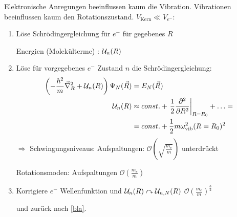	Elektronische Anregungen beeinflussen kaum die Vibration. Vibrationen beeinflussen kaum den Rotationszustand. 
	$V_{\mathrm{Kern}} \ll V_{e^-}$:
	\begin{enumerate}[1.]
		\item Löse Schrödingergleichung für $e^-$ für gegebenes $R$
		
			Energien (Molekülterme) : $\mathcal{U}_n(R)$
		\item Löse für vorgegebenes $e^-$ Zustand $n$ die Schrödingergleichung: \label{bla}
				\begin{align*}
					\left( - \frac{\hbar^2}{m} \vec{\nabla}_R^2 + \mathcal{U}_n (R)
					\right)	
					\Psi_N (\vec{R}) &= E_N (\vec{R}) \\
					\mathcal{U}_n (R) &\approx const. + \left.\frac{1}{2} \frac{\partial^2}{\partial R^2}
					\right|_{R=R_0} + \ldots = \\
					&= const. + \frac{1}{2} m \omega_{\mathrm{vib}}^2 (R=R_0)^2 
				\end{align*}
			$\Rightarrow$ Schwingungsniveaus: Aufspaltungen: $\mathscr{O} \left(\sqrt{\frac{m_e}{m}}\right)$ unterdrückt
			
			Rotationsmoden: Aufspaltungen $\mathscr{O} \left(\frac{m_e}{m}\right)$
			
		\item Korrigiere $e^-$ Wellenfunktion und $\mathcal{U}_n(R) \curvearrowright \mathcal{U}_{n,N}(R)$ 
			 $\mathscr{O} \left(\frac{m_e}{m}\right)^{\frac{3}{2}}$ 
			 
			 und zurück nach \ref{bla}.
	\end{enumerate}
